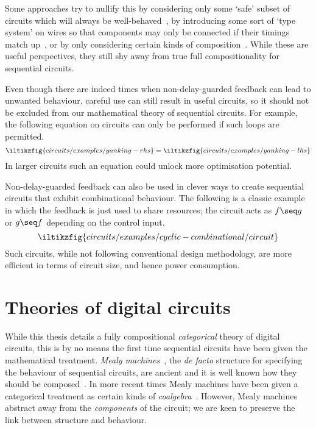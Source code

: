 Some approaches try to nullify this by considering only some `safe' subset of
circuits which will always be well-behaved~\cite{christensen2021wire}, by
introducing some sort of `type system' on wires so that components may only be
connected if their timings match up~\cite{nigam2023modular}, or by only
considering certain kinds of composition~\cite{alekseyev2014compositional}.
While these are useful perspectives, they still shy away from true full
compositionality for sequential circuits.

Even though there are indeed times when non-delay-guarded feedback can lead to
unwanted behaviour, careful use can still result in useful circuits, so it
should not be excluded from our mathematical theory of sequential circuits.
For example, the following equation on circuits can only be performed
if such loops are permitted.
\[
    \iltikzfig{circuits/examples/yanking-rhs}
    =
    \iltikzfig{circuits/examples/yanking-lhs}
\]
In larger circuits such an equation could unlock more optimisation potential.

Non-delay-guarded feedback can also be used in clever ways to create sequential
circuits that exhibit combinational behaviour.
The following is a classic example~\cite{malik1994analysis} in which the
feedback is just used to share resources; the circuit acts as \(f \seq g\) or
\(g \seq f\) depending on the control input.
\[
    \iltikzfig{circuits/examples/cyclic-combinational/circuit}
\]
Such circuits, while not following conventional design methodology, are more
efficient in terms of circuit size, and hence power consumption.

\section{Theories of digital circuits}

While this thesis details a fully compositional
\emph{categorical} theory of digital circuits, this is by no means the first
time sequential circuits have been given the mathematical treatment.
\emph{Mealy machines}~\cite{mealy1955method}, the \emph{de facto} structure for
specifying the behaviour of sequential circuits, are ancient and it is well
known how they should be composed~\cite{ginzburg2014algebraic}.
In more recent times Mealy machines have been given a categorical treatment as
certain kinds of \emph{coalgebra}~\cite{rutten2006algebraic,bonsangue2008coalgebraic}.
However, Mealy machines abstract away from the \emph{components} of the circuit;
we are keen to preserve the link between structure and behaviour.

